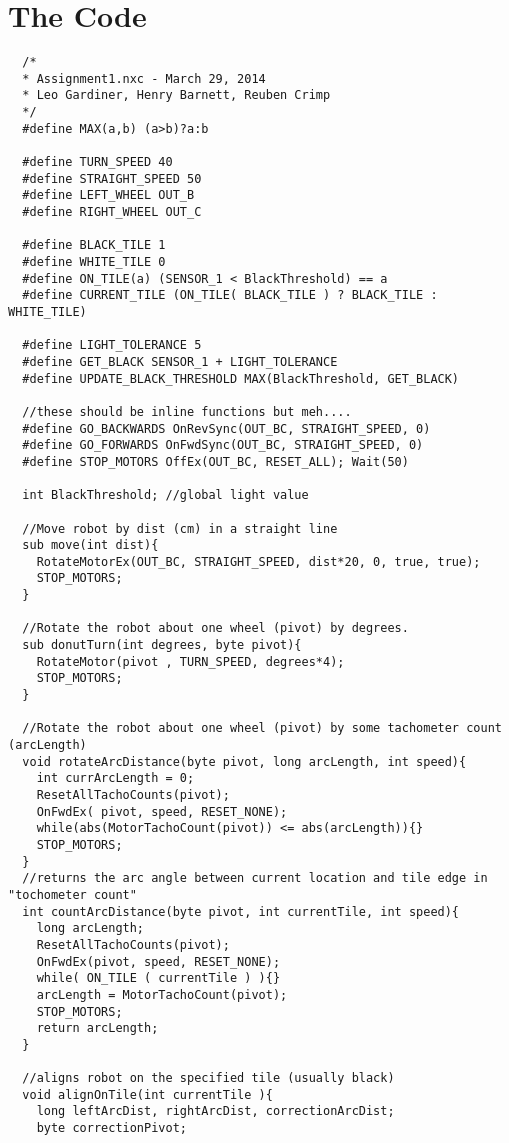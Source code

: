 \documentclass[a4paper,11pt]{article}
\begin{document}
\clearpage
\section {The Code}

\begin{lstlisting}
  /*
  * Assignment1.nxc - March 29, 2014
  * Leo Gardiner, Henry Barnett, Reuben Crimp
  */
  #define MAX(a,b) (a>b)?a:b

  #define TURN_SPEED 40
  #define STRAIGHT_SPEED 50
  #define LEFT_WHEEL OUT_B
  #define RIGHT_WHEEL OUT_C

  #define BLACK_TILE 1
  #define WHITE_TILE 0
  #define ON_TILE(a) (SENSOR_1 < BlackThreshold) == a
  #define CURRENT_TILE (ON_TILE( BLACK_TILE ) ? BLACK_TILE : WHITE_TILE)

  #define LIGHT_TOLERANCE 5
  #define GET_BLACK SENSOR_1 + LIGHT_TOLERANCE
  #define UPDATE_BLACK_THRESHOLD MAX(BlackThreshold, GET_BLACK)

  //these should be inline functions but meh....
  #define GO_BACKWARDS OnRevSync(OUT_BC, STRAIGHT_SPEED, 0)
  #define GO_FORWARDS OnFwdSync(OUT_BC, STRAIGHT_SPEED, 0)
  #define STOP_MOTORS OffEx(OUT_BC, RESET_ALL); Wait(50)

  int BlackThreshold; //global light value

  //Move robot by dist (cm) in a straight line
  sub move(int dist){
    RotateMotorEx(OUT_BC, STRAIGHT_SPEED, dist*20, 0, true, true);
    STOP_MOTORS;
  }

  //Rotate the robot about one wheel (pivot) by degrees.
  sub donutTurn(int degrees, byte pivot){
    RotateMotor(pivot , TURN_SPEED, degrees*4);
    STOP_MOTORS;
  }

  //Rotate the robot about one wheel (pivot) by some tachometer count (arcLength)
  void rotateArcDistance(byte pivot, long arcLength, int speed){
    int currArcLength = 0;
    ResetAllTachoCounts(pivot);
    OnFwdEx( pivot, speed, RESET_NONE);
    while(abs(MotorTachoCount(pivot)) <= abs(arcLength)){}
    STOP_MOTORS;
  }
  //returns the arc angle between current location and tile edge in "tochometer count"
  int countArcDistance(byte pivot, int currentTile, int speed){
    long arcLength;
    ResetAllTachoCounts(pivot);
    OnFwdEx(pivot, speed, RESET_NONE);
    while( ON_TILE ( currentTile ) ){}
    arcLength = MotorTachoCount(pivot);
    STOP_MOTORS;
    return arcLength;
  }

  //aligns robot on the specified tile (usually black)
  void alignOnTile(int currentTile ){
    long leftArcDist, rightArcDist, correctionArcDist;
    byte correctionPivot;


\end{lstlisting}
\end{document}
